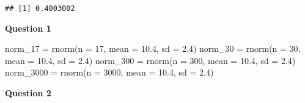 \documentclass[
]{article}
\newenvironment{Shaded}{\begin{snugshade}}{\end{snugshade}}
\newcommand{\AttributeTok}[1]{\textcolor[rgb]{0.77,0.63,0.00}{#1}}
\newcommand{\DecValTok}[1]{\textcolor[rgb]{0.00,0.00,0.81}{#1}}
\newcommand{\FloatTok}[1]{\textcolor[rgb]{0.00,0.00,0.81}{#1}}
\newcommand{\FunctionTok}[1]{\textcolor[rgb]{0.00,0.00,0.00}{#1}}
\newcommand{\NormalTok}[1]{#1}
\newcommand{\OtherTok}[1]{\textcolor[rgb]{0.56,0.35,0.01}{#1}}
\newcommand{\SpecialCharTok}[1]{\textcolor[rgb]{0.00,0.00,0.00}{#1}}
\begin{document}
\begin{Shaded}
\end{Shaded}

\begin{verbatim}
## [1] 0.4003002
\end{verbatim}

\textbf{Question 1}

\begin{Shaded}
\begin{Highlighting}[]
\NormalTok{norm\_17 }\OtherTok{=} \FunctionTok{rnorm}\NormalTok{(}\AttributeTok{n =} \DecValTok{17}\NormalTok{, }\AttributeTok{mean =} \FloatTok{10.4}\NormalTok{, }\AttributeTok{sd =} \FloatTok{2.4}\NormalTok{)}
\NormalTok{norm\_30 }\OtherTok{=} \FunctionTok{rnorm}\NormalTok{(}\AttributeTok{n =} \DecValTok{30}\NormalTok{, }\AttributeTok{mean =} \FloatTok{10.4}\NormalTok{, }\AttributeTok{sd =} \FloatTok{2.4}\NormalTok{)}
\NormalTok{norm\_300 }\OtherTok{=} \FunctionTok{rnorm}\NormalTok{(}\AttributeTok{n =} \DecValTok{300}\NormalTok{, }\AttributeTok{mean =} \FloatTok{10.4}\NormalTok{, }\AttributeTok{sd =} \FloatTok{2.4}\NormalTok{)}
\NormalTok{norm\_3000 }\OtherTok{=} \FunctionTok{rnorm}\NormalTok{(}\AttributeTok{n =} \DecValTok{3000}\NormalTok{, }\AttributeTok{mean =} \FloatTok{10.4}\NormalTok{, }\AttributeTok{sd =} \FloatTok{2.4}\NormalTok{)}
\end{Highlighting}
\end{Shaded}

\textbf{Question 2}
\end{document}
